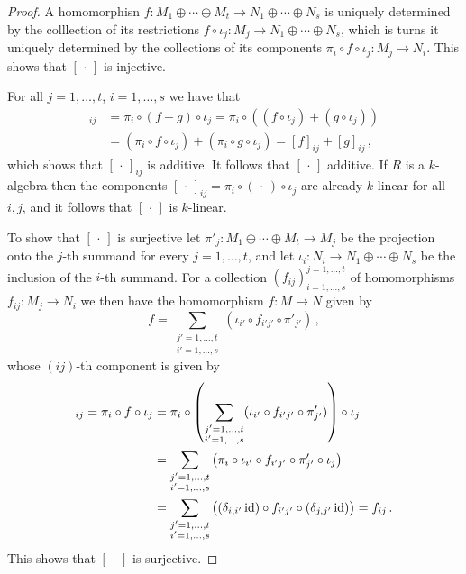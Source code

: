 \begin{proof}
  A homomorphisn $f \colon M_1 \oplus \dotsb \oplus M_t \to N_1 \oplus \dotsb \oplus N_s$ is uniquely determined by the colllection of its restrictions $f \circ \iota_j \colon M_j \to N_1 \oplus \dotsb \oplus N_s$, which is turns it uniquely determined by the collections of its components $\pi_i \circ f \circ \iota_j \colon M_j \to N_i$.
  This shows that $[\,\cdot\,]$ is injective.
  
  For all $j = 1, \dotsc, t$, $i = 1, \dotsc, s$ we have that
  \begin{align*}
        [f+g]_{ij}
    &=  \pi_i \circ (f+g) \circ \iota_j
     =  \pi_i \circ ((f \circ \iota_j) + (g \circ \iota_j)) \\
    &=  (\pi_i \circ f \circ \iota_j) + (\pi_i \circ g \circ \iota_j)
     =  [f]_{ij} + [g]_{ij} \,,
  \end{align*}
  which shows that $[\,\cdot\,]_{ij}$ is additive.
  It follows that $[\,\cdot\,]$ additive.
  If $R$ is a $k$-algebra then the components $[\,\cdot\,]_{ij} = \pi_i \circ (\,\cdot\,) \circ \iota_j$ are already $k$-linear for all $i, j$, and it follows that $[\,\cdot\,]$ is $k$-linear.
  
  To show that $[\,\cdot\,]$ is surjective let $\pi'_j \colon M_1 \oplus \dotsb \oplus M_t \to M_j$ be the projection onto the $j$-th summand for every $j = 1, \dotsc, t$, and let $\iota_i \colon N_i \to N_1 \oplus \dotsb \oplus N_s$ be the inclusion of the $i$-th summand.
  For a collection $(f_{ij})^{j = 1, \dotsc, t}_{i = 1, \dotsc, s}$ of homomorphisms $f_{ij} \colon M_j \to N_i$ we then have the homomorphism $f \colon M \to N$ given by
  \[
      f
    = \sum_{\substack{j' = 1, \dotsc, t \\ i' = 1, \dotsc, s}} (\iota_{i'} \circ f_{i'j'} \circ \pi'_{j'}) \,,
  \]
  whose $(ij)$-th component is given by
  \begin{align*}
        [f]_{ij}
     =  \pi_i \circ f \circ \iota_j
    &=  \pi_i
        \circ
        \left(
          \sum_{\substack{j' = 1, \dotsc, t \\ i' = 1, \dotsc, s}} (\iota_{i'} \circ f_{i'j'} \circ \pi'_{j'})
        \right)
        \circ
        \iota_j \\
    &=  \sum_{\substack{j' = 1, \dotsc, t \\ i' = 1, \dotsc, s}}
        \big(
        \pi_i \circ \iota_{i'} \circ f_{i'j'} \circ \pi'_{j'} \circ \iota_j
        \big) \\
    &=  \sum_{\substack{j' = 1, \dotsc, t \\ i' = 1, \dotsc, s}}
        \big(
        (\delta_{i,i'} \id) \circ f_{i'j'} \circ (\delta_{j,j'} \id)
        \big)
     =  f_{ij} \,.
  \end{align*}
  This shows that $[\,\cdot\,]$ is surjective.
\end{proof}


